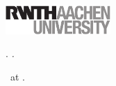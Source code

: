 \begin{titlepage}
	\begin{addmargin}[-1cm]{-3cm}
    \begin{center}
        \large  

        \hfill

        \vfill

        \begingroup
            \spacedlowsmallcaps{\myName}\\[0.35cm]
            \color{Maroon}\spacedallcaps{\myTitle}\\
            \Large\itshape\mySubtitle \vspace{10cm}
        \endgroup

        \vfill                      

    \end{center}  
  \end{addmargin}       
\end{titlepage}


\thispagestyle{empty}

\noindent\includegraphics[width=4cm]{gfx/rwth_sw}

\hfill

\vfill

\noindent\myName. \textit{\myTitle.}

\medskip

\noindent \myDegree\ at \myFaculty.

\medskip

\noindent{}

\bigskip\bigskip\bigskip\bigskip

\noindent{} \\
\myProf

\medskip

\noindent{} \\
\myOtherProf

\bigskip

\noindent{} \\
\mySupervisor\\
\myOtherSupervisor
